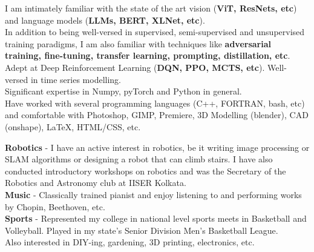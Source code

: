 \documentclass[10pt,a4paper]{article}
\begin{document}
	  I am intimately familiar with the state of the art vision (\textbf{ViT, ResNets, etc}) and language models (\textbf{LLMs, BERT, XLNet, etc}).\\
	  In addition to being well-versed in supervised, semi-supervised and unsupervised training paradigms, I am also familiar with techniques like \textbf{adversarial training, fine-tuning, transfer learning, prompting, distillation, etc}.\\
	  Adept at Deep Reinforcement Learning (\textbf{DQN, PPO, MCTS, etc}). Well-versed in time series modelling. \\
	  Significant expertise in Numpy, pyTorch and Python in general.\\
	  Have worked with several programming languages (C++, FORTRAN, bash, etc) and comfortable with Photoshop, GIMP, Premiere, 3D Modelling (blender), CAD (onshape), \LaTeX, HTML/CSS, etc.

\spacedhrule{1.6em}{-0.4em}
	  \textbf{Robotics} - I have an active interest in robotics, be it writing image processing or SLAM algorithms or designing a robot that can climb stairs. I have also conducted introductory workshops on robotics and was the Secretary of the Robotics and Astronomy club at IISER Kolkata.\\
	  \textbf{Music} - Classically trained pianist and enjoy listening to and performing works by Chopin, Beethoven, etc.\\
	  \textbf{Sports} - Represented my college in national level sports meets in Basketball and Volleyball. Played in my state's Senior Division Men's Basketball League.\\
	  Also interested in DIY-ing, gardening, 3D printing, electronics, etc.\\

\spacedhrule{1.6em}{-0.4em}
\end{document}

